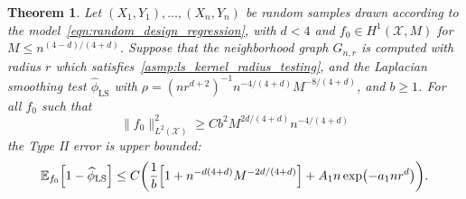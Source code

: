 \documentclass{article}
\newcommand{\1}{\mathbf{1}}
\newcommand{\Xset}{\mathcal{X}}
\newcommand{\Leb}{L}
\newcommand{\Ebb}{\mathbb{E}}
\newcommand{\wh}[1]{\widehat{#1}}
\newcommand{\LS}{\mathrm{LS}}
\theoremstyle{alden}
\theoremstyle{aldenthm}
\newtheorem{theorem}{Theorem}
\theoremstyle{definition}
\theoremstyle{remark}
\begin{document}
\begin{theorem}
	\label{thm:laplacian_smoothing_testing}
	Let $(X_1,Y_1),\ldots,(X_n,Y_n)$ be random samples drawn according to the model~\eqref{eqn:random_design_regression}, with $d < 4$ and $f_0 \in H^1(\Xset,M)$ for $M \leq n^{(4 - d)/(4 + d)}$. Suppose that the neighborhood graph $G_{n,r}$ is computed with radius $r$ which satisfies~\ref{asmp:ls_kernel_radius_testing}, and the Laplacian smoothing test $\wh{\phi}_{\LS}$ with $\rho = (nr^{d + 2})^{-1} n^{-4/(4 + d)} M^{-8/(4 + d)}$, and $b \geq 1$. For all $f_0$ such that
	\begin{equation}
	\label{eqn:laplacian_smoothing_testing}
	\bigl\|f_0\bigr\|_{\Leb^2(\Xset)}^2 \geq C b^2 M^{2d/(4 + d)} n^{-4/(4 + d)}
	\end{equation} 
	the Type II error is upper bounded:
	\begin{equation*}
	\Ebb_{f_0}\Bigl[1 - \wh{\phi}_{\LS} \Bigr] \leq C\biggl(\frac{1}{b}\Bigl[1 + n^{-d(4 + d)}M^{-2d/(4 + d)}\Bigr] + A_1n\exp\bigl(-a_1nr^d\bigr)\biggr).
	\end{equation*}
\end{theorem}
\end{document}

